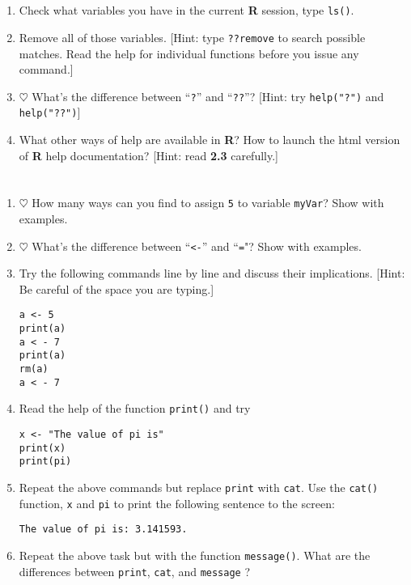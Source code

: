 \documentclass[a4paper]{article}
\begin{document}
\section{}
\begin{enumerate}
\item Check what variables you have in the current \textbf{R} session, type \texttt{ls()}.
\item Remove all of those variables. [Hint: type \texttt{??remove} to search
  possible matches. Read the help for individual functions before you issue any
  command.]
\item $\heartsuit$ What's the difference between ``\texttt{?}'' and ``\texttt{??}''? [Hint: try
  \texttt{help("?")} and \texttt{help("??")}]
\item What other ways of help are available in \textbf{R}? How to launch the html version of \textbf{R} help documentation? [Hint: read \textbf{2.3}
  carefully.]
\end{enumerate}

\section{}
\begin{enumerate}
\item $\heartsuit$ How many ways can you find to assign \texttt{5} to variable
  \texttt{myVar}? Show with examples.
\item $\heartsuit$ What's the difference between ``\texttt{<-}'' and ``\texttt{=}"? Show
  with examples.
\item  Try the following commands line by line and discuss their implications. [Hint: Be careful of the space you are typing.]
\begin{verbatim}
a <- 5
print(a)
a < - 7
print(a)
rm(a)
a < - 7
\end{verbatim}
\item Read the help of the function \texttt{print()} and try
\begin{verbatim}
x <- "The value of pi is"
print(x)
print(pi)
\end{verbatim}
\item Repeat the above commands but replace \texttt{print} with
  \texttt{cat}. Use the \texttt{cat()} function, \texttt{x} and \texttt{pi} to print the
  following sentence to the screen:
\begin{verbatim}
The value of pi is: 3.141593.
\end{verbatim}
\item Repeat the above task but with the function \texttt{message()}. What are
  the differences between \texttt{print}, \texttt{cat}, and \texttt{message} ?
\end{enumerate}
\end{document}

